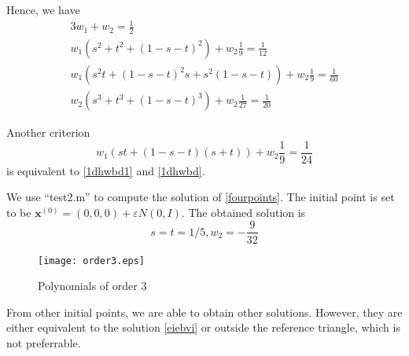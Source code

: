 \documentclass[conference,onecolumn, 12pt]{IEEEtran}
\begin{document}

Hence, we have
\begin{subequations}
    \label{fourpoints}
    \begin{align}
        3w_1+w_2=\frac{1}{2}\label{1dhwbd1}\\ 
        w_1(s^2+t^2+(1-s-t)^2)+w_2\frac{1}{9}=\frac{1}{12}\label{1dhwbd}\\
        w_1(s^2t+(1-s-t)^2s+s^2(1-s-t))+w_2\frac{1}{9}=\frac{1}{60}\\
        w_2(s^3+t^3+(1-s-t)^3)+w_2\frac{1}{27}=\frac{1}{20}
    \end{align}
\end{subequations}

Another criterion
\begin{equation}
    w_1(st+(1-s-t)(s+t))+w_2\frac{1}{9}=\frac{1}{24}
\end{equation}
is equivalent to \ref{1dhwbd1} and \ref{1dhwbd}.

We use ``test2.m'' to compute the solution of \ref{fourpoints}. The initial point is set to be $\mathbf{x}^{(0)}=(0,0,0) +\varepsilon N(0,I)$. The obtained solution is
\begin{equation}
    \label{eiebvi}
    s=t=1/5,w_2=-\frac{9}{32}
\end{equation}

\begin{figure}[!htbp]
    \centering
    \texttt{[image: order3.eps]}
    \caption{Polynomials of order 3}
    \label{p3}
\end{figure}


From other initial points, we are able to obtain other solutions. However, they are either equivalent to the solution \ref{eiebvi} or outside the reference triangle, which is not preferrable.
\end{document}
